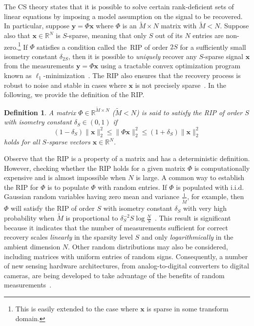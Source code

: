 \documentclass[11pt,draftcls,onecolumn]{IEEEtran}
\def\real    { \mathbb{R} }
\newtheorem{definition}{Definition}
\def \km {{\widetilde{M}}}
\newcommand{\cut}[1]{}
\newcommand{\vc}[1]{\boldsymbol{#1}}
\def\real    { \mathbb{R} }
\begin{document}
The CS theory states that it is possible to solve certain rank-deficient sets of linear equations by imposing a model assumption on the signal to be recovered. In particular, suppose $\vc{y} = \Phi \vc{x}$ where $\Phi$ is an $\km \times N$ matrix with $\km < N$. Suppose also that $\vc{x} \in \real^N$ is $S$-sparse, meaning that only $S$ out of its $N$ entries are non-zero.\footnote{This is easily extended to the case where $\vc{x}$ is sparse in some transform domain.}
If $\Phi$ satisfies a condition called the~\ac{RIP} of order $2S$ for a sufficiently small isometry constant $\delta_{2S}$, then it is possible to {\emph{uniquely}} recover any $S$-sparse signal $\vc{x}$ from the measurements $\vc{y} = \Phi \vc{x}$ using a tractable convex optimization program known as $\ell_1$-minimization~\cite{CompSenDon,CompSampCand}. The RIP also ensures that the recovery process is robust to noise and stable in cases where $\vc{x}$ is not precisely sparse~\cite{CandesRIP}.\cut{Similar statements can be made for recovery using various iterative greedy algorithms~\cite{tropp2007signal,needell2009uniform,needell2009cosamp,dai2009subspace}.
}
In the following, we provide the definition of the \ac{RIP}.
\begin{definition}
A matrix $\Phi \in \real^{\km \times N}$ ($\km < N$) is said to satisfy the \ac{RIP} of order $S$ with isometry constant $\delta_S \in \left(0, 1\right)$ if
\begin{equation}
(1-\delta_S) \|\vc{x}\|^2_2 \le \| \Phi \vc{x}\|^2_2 \le (1+\delta_S) \|\vc{x}\|^2_2
\label{eq:rip}
\end{equation}
holds for all $S$-sparse vectors $\vc{x} \in \real^N$.
\label{def:rip}
\end{definition}

Observe that the \ac{RIP} is a property of a matrix and has a deterministic definition. However, checking whether the \ac{RIP} holds for a given matrix $\Phi$ is computationally expensive and is almost impossible when $N$ is large.
A common way to establish the \ac{RIP} for $\Phi$ is to populate $\Phi$ with random entries.
If $\Phi$ is populated with \ac{i.i.d.} Gaussian random variables having zero mean and variance $\frac{1}{\km}$, for example, then $\Phi$ will satisfy the \ac{RIP} of order $S$ with isometry constant $\delta_S$ with very high probability when $\km$ is 
proportional to $\delta^{-2}_SS \log \frac{N}{S}$~\cite{candes2008people,baraniuk2008simple,davenport2010thesis}.
This result is significant because it indicates that the number of measurements sufficient for correct recovery scales \emph{linearly} in the sparsity level $S$ and only \emph{logarithmically} in the ambient dimension $N$. Other random distributions may also be considered, including matrices with uniform entries of random signs.
Consequently, a number of new sensing hardware architectures, from analog-to-digital converters to digital cameras, are being developed to take advantage of the benefits of random measurements~\cite{duarte2008single,healySPmag,wakin2012non,yoo2012compressed}.
\end{document}
